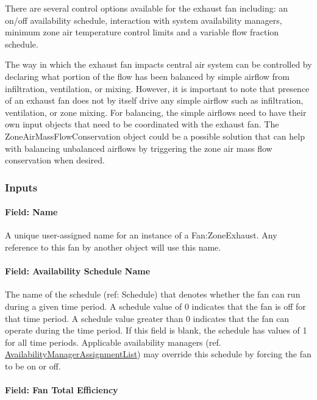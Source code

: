 There are several control options available for the exhaust fan including: an on/off availability schedule, interaction with system availability managers, minimum zone air temperature control limits and a variable flow fraction schedule.

The way in which the exhaust fan impacts central air system can be controlled by declaring what portion of the flow has been balanced by simple airflow from infiltration, ventilation, or mixing. However, it is important to note that presence of an exhaust fan does not by itself drive any simple airflow such as infiltration, ventilation, or zone mixing. For balancing, the simple airflows need to have their own input objects that need to be coordinated with the exhaust fan. The ZoneAirMassFlowConservation object could be a possible solution that can help with balancing unbalanced airflows by triggering the zone air mass flow conservation when desired.

\subsubsection{Inputs}\label{inputs-3-014}

\paragraph{Field: Name}\label{field-name-3-013}

A unique user-assigned name for an instance of a Fan:ZoneExhaust. Any reference to this fan by another object will use this name.

\paragraph{Field: Availability Schedule Name}\label{field-availability-schedule-name-3-002}

The name of the schedule (ref: Schedule) that denotes whether the fan can run during a given time period. A schedule value of 0 indicates that the fan is off for that time period. A schedule value greater than 0 indicates that the fan can operate during the time period. If this field is blank, the schedule has values of 1 for all time periods. Applicable availability managers (ref. \hyperref[availabilitymanagerassignmentlist]{AvailabilityManagerAssignmentList}) may override this schedule by forcing the fan to be on or off.

\paragraph{Field: Fan Total Efficiency}\label{field-fan-total-efficiency-3}

